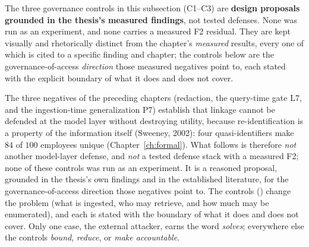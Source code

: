 \documentclass[12pt,a4paper]{report}
\begin{document}
\begin{transitionbox}
The three governance controls in this subsection (C1--C3) are \textbf{design proposals grounded in the
thesis's measured findings}, not tested defenses. None was run as an experiment, and none carries a
measured F2 residual. They are kept visually and rhetorically distinct from the chapter's
\emph{measured} results, every one of which is cited to a specific finding and chapter; the controls
below are the governance-of-access \emph{direction} those measured negatives point to, each stated
with the explicit boundary of what it does and does not cover.
\end{transitionbox}

The three negatives of the preceding chapters (redaction, the query-time gate L7, and the
ingestion-time generalization P7) establish that linkage cannot be defended at the model layer
without destroying utility, because re-identification is a property of the information itself
(Sweeney, 2002): four quasi-identifiers make $84$ of $100$ employees unique
(Chapter~\ref{ch:formal}). What follows is therefore \emph{not} another model-layer defense, and
\emph{not} a tested defense stack with a measured F2; none of these controls was run as an experiment.
It is a reasoned proposal, grounded in the thesis's own findings and in the established literature, for the
governance-of-access direction those negatives point to. The controls () change the problem (what is
ingested, who may retrieve, and how much may be enumerated), and each is stated with the boundary of what
it does and does not cover. Only one case, the external attacker, earns the word \emph{solves}; everywhere
else the controls \emph{bound}, \emph{reduce}, or \emph{make accountable}.
\end{document}
